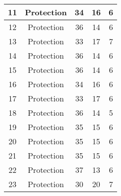 \documentclass[results.tex]{subfiles}
\begin{document}
\begin{center}
\begin{tabular}{| c || c | c | c | c |}
            \hline
            11                      & Protection                   & 34                     & 16                      & 6                    \\
            \hline
            12                      & Protection                   & 36                     & 14                      & 6                    \\
            \hline
            13                      & Protection                   & 33                     & 17                      & 7                    \\
            \hline
            14                      & Protection                   & 36                     & 14                      & 6                    \\
            \hline
            15                      & Protection                   & 36                     & 14                      & 6                    \\
            \hline
            16                      & Protection                   & 34                     & 16                      & 6                    \\
            \hline
            17                      & Protection                   & 33                     & 17                      & 6                    \\
            \hline
            18                      & Protection                   & 36                     & 14                      & 5                    \\
            \hline
            19                      & Protection                   & 35                     & 15                      & 6                    \\
            \hline
            20                      & Protection                   & 35                     & 15                      & 6                    \\
            \hline
            21                      & Protection                   & 35                     & 15                      & 6                    \\
            \hline
            22                      & Protection                   & 37                     & 13                      & 6                    \\
            \hline
            23                      & Protection                   & 30                     & 20                      & 7                    \\

\end{tabular}
\end{center}
\end{document}
